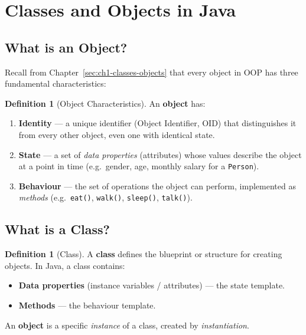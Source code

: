 \documentclass[11pt, a4paper, notitlepage]{report}
\theoremstyle{definition}
\newtheorem{definition}[theorem]{Definition}
\theoremstyle{remark}
\theoremstyle{definition}
\begin{document}
\section{Classes and Objects in Java}
\label{sec:ch2-classes-objects}

\subsection{What is an Object?}
\label{sec:ch2-object}

Recall from Chapter~\ref{sec:ch1-classes-objects} that every object in OOP has three fundamental characteristics:

\begin{definition}[Object Characteristics]
\label{def:ch2-object}
An \textbf{object} has:
\begin{enumerate}
  \item \textbf{Identity} --- a unique identifier (Object Identifier, OID) that distinguishes it from every other object, even one with identical state.
  \item \textbf{State} --- a set of \emph{data properties} (attributes) whose values describe the object at a point in time (e.g.\ gender, age, monthly salary for a \texttt{Person}).
  \item \textbf{Behaviour} --- the set of operations the object can perform, implemented as \emph{methods} (e.g.\ \texttt{eat()}, \texttt{walk()}, \texttt{sleep()}, \texttt{talk()}).
\end{enumerate}
\end{definition}

\subsection{What is a Class?}
\label{sec:ch2-class}

\begin{definition}[Class]
\label{def:ch2-class}
A \textbf{class} defines the blueprint or structure for creating objects. In Java, a class contains:
\begin{itemize}
  \item \textbf{Data properties} (instance variables / attributes) --- the state template.
  \item \textbf{Methods} --- the behaviour template.
\end{itemize}
An \textbf{object} is a specific \emph{instance} of a class, created by \emph{instantiation}.
\end{definition}
\end{document}
